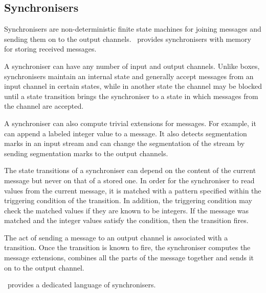 

    \subsection*{Synchronisers}
Synchronisers are non-deterministic finite state machines for joining messages and sending them on to the output channels. \ak\ provides synchronisers with memory for storing received messages.

A synchroniser can have any number of input and output channels. Unlike boxes, synchronisers maintain an internal state and generally accept messages from an input channel in certain states, while in another state the channel may be blocked until a state transition brings the synchroniser to a state in which messages from the channel are accepted.

A synchroniser can also compute trivial extensions for messages. For example, it can append a labeled integer value to a message. It also detects segmentation marks in an input stream and can change the segmentation of the stream by sending segmentation marks to the output channels.

The state transitions of a synchroniser can depend on the content of the current message but never on that of a stored one. In order for the synchroniser to read values from the current message, it is matched with a pattern specified within the triggering condition of the transition. In addition, the triggering condition may check the matched values if they are known to be integers. If the message was matched and the integer values satisfy the condition, then the transition fires.

The act of sending a message to an output channel is associated with a transition. Once the transition is known to fire, the synchroniser computes the message extensions, combines all the parts of the message together and sends it on to the output channel.

\ak\ provides a dedicated language of synchronisers.


